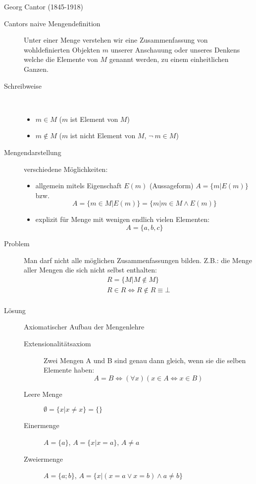 Georg Cantor (1845-1918)
\begin{description}
    \item[Cantors naive Mengendefinition] Unter einer Menge verstehen wir eine Zusammenfassung von wohldefinierten Objekten $m$ unserer Anschauung oder unseres Denkens welche die Elemente von $M$ genannt werden, zu einem einheitlichen Ganzen.
    \item[Schreibweise]\
    \begin{itemize}
        \item $m \in M$ ($m$ ist Element von $M$)
        \item $m \not\in M$ ($m$ ist nicht Element von $M$, $\neg\ m \in M$)
    \end{itemize}
    \item[Mengendarstellung] verschiedene Möglichkeiten:
    \begin{itemize}
        \item allgemein mitels Eigenschaft $E(m)$ (Aussageform) $A=\lbrace m|E(m) \rbrace$ bzw.
        \[A = \lbrace m \in M | E(m) \rbrace = \lbrace m | m \in M \wedge E(m) \rbrace\]
        \item explizit für Menge mit wenigen endlich vielen Elementen:
        \[A=\lbrace a, b, c\rbrace\]
    \end{itemize}
    \item[Problem] Man darf nicht alle möglichen Zusammenfassungen bilden. Z.B.: die Menge aller Mengen die sich nicht selbst enthalten:
    \begin{gather*}
        R=\lbrace M | M \not \in M \rbrace\\
        R \in R \Leftrightarrow R \not \in R \equiv \bot\\
    \end{gather*}
    \item[Lösung] Axiomatischer Aufbau der Mengenlehre
    \begin{description}
        \item[Extensionalitätsaxiom] Zwei Mengen A und B sind genau dann gleich, wenn sie die selben Elemente haben:
        \[A = B \Leftrightarrow (\forall x)(x \in A \Leftrightarrow x \in B)\]
        \item[Leere Menge] $\emptyset = \lbrace x | x \not = x\rbrace = \lbrace\rbrace$
        \item[Einermenge] $A=\lbrace a \rbrace$, $A = \lbrace x | x = a \rbrace$, $A \not = a$
        \item[Zweiermenge] $A=\lbrace a; b \rbrace$, $A = \lbrace x|(x=a \vee x=b) \wedge a \not = b \rbrace$

\end{description}
\end{description}
